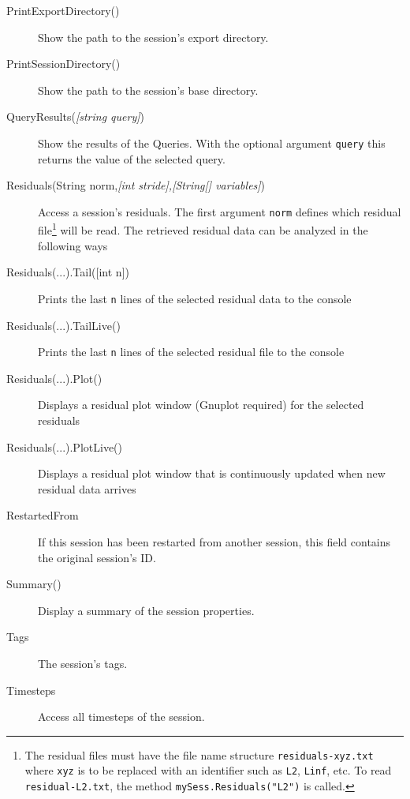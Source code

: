 \begin{description}
	\item[PrintExportDirectory()]
	Show the path to the session's export directory.
	
	\item[PrintSessionDirectory()]
	Show the path to the session's base directory.
	
	\item[QueryResults(\emph{{[}string query{]}})]
	Show the results of the Queries. With the optional argument \lstinline{query} this returns the value of the selected query.
	
	\item[Residuals(String norm,\emph{{[}int stride{]},{[}String{[}{]} variables{]}})]
	Access a session's residuals. The first argument \lstinline{norm} defines which residual file\footnote{The residual files must have the file name structure \lstinline{residuals-xyz.txt} where \lstinline{xyz} is to be replaced with an identifier such as \lstinline{L2}, \lstinline{Linf}, etc. To read \lstinline{residual-L2.txt}, the method \lstinline{mySess.Residuals("L2")} is called.} will be read. The retrieved residual data can be analyzed in the following ways
	
	\item[Residuals(...).Tail({[}int n{]})]
	Prints the last \lstinline{n} lines of the selected residual data to the console
	
	\item[Residuals(...).TailLive()]
	Prints the last \lstinline{n} lines of the selected residual file to the console
	
	\item[Residuals(...).Plot()]
	Displays a residual plot window (Gnuplot required) for the selected residuals
	
	\item[Residuals(...).PlotLive()]
	Displays a residual plot window that is continuously updated when new residual data arrives
	
	\item[RestartedFrom]
	If this session has been restarted from another session, this field contains the original session's ID.
	
	\item[Summary()]
	Display a summary of the session properties.	
	
	\item[Tags]
	The session's tags.
	
	\item[Timesteps]
	Access all timesteps of the session.
\end{description}

